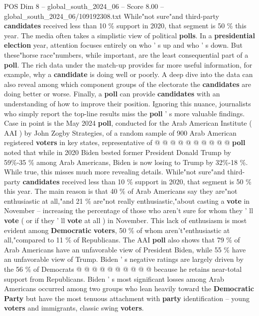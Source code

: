 \begin{textsample}{POS Dim 8 – global\_south\_2024\_06 – Score 8.00 – global\_south\_2024\_06/109192308.txt}  \label{ex:f8_pos_210}
While"not sure"and third-party \textbf{candidates} received less than 10 \% support in 2020, that segment is 50 \% this year.
The media often takes a simplistic view of political \textbf{polls}.
In a \textbf{presidential} \textbf{election} year, attention focuses entirely on who ' s up and who ' s down.
But these"horse race"numbers, while important, are the least consequential part of a \textbf{poll}.
The rich data under the match-up provides far more useful information, for example, why a \textbf{candidate} is doing well or poorly.
A deep dive into the data can also reveal among which component groups of the electorate the \textbf{candidates} are doing better or worse.
Finally, a \textbf{poll} can provide \textbf{candidates} with an understanding of how to improve their position.
Ignoring this nuance, journalists who simply report the top-line results miss the \textbf{poll} ' s more valuable findings.
Case in point is the May 2024 \textbf{poll}, conducted for the Arab American Institute ( AAI ) by John Zogby Strategies, of a random sample of 900 Arab American registered \textbf{voters} in key states, representative of @ @ @ @ @ @ @ @ @ @ \textbf{poll} noted that while in 2020 Biden bested former President Donald Trump by 59\%-35 \% among Arab Americans, Biden is now losing to Trump by 32\%-18 \%.
While true, this misses much more revealing details.
While"not sure"and third-party \textbf{candidates} received less than 10 \% support in 2020, that segment is 50 \% this year.
The main reason is that 40 \% of Arab Americans say they are"not enthusiastic at all,"and 21 \% are"not really enthusiastic,"about casting a \textbf{vote} in November -- increasing the percentage of those who aren't sure for whom they ' ll \textbf{vote} ( or if they ' ll \textbf{vote} at all ) in November.
This lack of enthusiasm is most evident among \textbf{Democratic} \textbf{voters}, 50 \% of whom aren't"enthusiastic at all,"compared to 11 \% of Republicans.
The AAI \textbf{poll} also shows that 79 \% of Arab Americans have an unfavorable view of President Biden, while 55 \% have an unfavorable view of Trump.
Biden ' s negative ratings are largely driven by the 56 \% of Democrats @ @ @ @ @ @ @ @ @ @ because he retains near-total support from Republicans.
Biden ' s most significant losses among Arab Americans occurred among two groups who lean heavily toward the \textbf{Democratic} \textbf{Party} but have the most tenuous attachment with \textbf{party} identification -- young \textbf{voters} and immigrants, classic swing \textbf{voters}.

\end{textsample}
